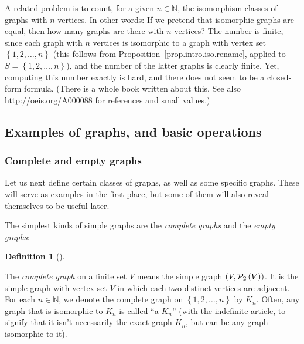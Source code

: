 \documentclass[numbers=enddot,12pt,final,onecolumn,notitlepage]{scrartcl}%
\theoremstyle{definition}
\newtheorem{defi}[theo]{Definition}
\newenvironment{definition}[1][]
{\begin{defi}[#1]\begin{leftbar}}
{\end{leftbar}\end{defi}}
\newcommand{\NN}{\mathbb{N}}
\newcommand{\powset}[2][]{\ifthenelse{\equal{#2}{}}{\mathcal{P}\left(#1\right)}{\mathcal{P}_{#1}\left(#2\right)}}
\newcommand{\set}[1]{\left\{ #1 \right\}}
\newcommand{\tup}[1]{\left( #1 \right)}
\begin{document}
A related problem is to count, for a given $n \in \NN$,
the isomorphism classes of graphs with $n$ vertices. In other words:
If we pretend that isomorphic graphs are equal, then how many graphs
are there with $n$ vertices? The number is finite, since each graph
with $n$ vertices is isomorphic to a graph with vertex set
$\set{1,2,\ldots, n}$ (this follows from
Proposition~\ref{prop.intro.iso.rename}, applied to
$S = \set{1,2,\ldots, n}$), and the number of the latter graphs is
clearly finite. Yet, computing this number exactly is hard, and there
does not seem to be a closed-form formula. (There is a whole book
\cite{HarPal73} written about this. See also
\url{http://oeis.org/A000088} for references and small values.)

\subsection{\label{sect.intro.paths}Examples of graphs, and basic
operations}

\subsubsection{Complete and empty graphs}

Let us next define certain classes of graphs, as well as some specific
graphs. These will serve as examples in the first place, but some of
them will also reveal themselves to be useful later.

The simplest kinds of simple graphs are the \textit{complete graphs}
and the \textit{empty graphs}:

\begin{definition} \label{def.intro.complete-graph}
The \textit{complete graph} on a finite set $V$ means
the simple graph $\tup{V, \powset[2]{V}}$. It is the
simple graph with vertex set $V$ in which each two distinct vertices
are adjacent.
For each $n \in \NN$, we denote the complete graph on
$\set{1,2,\ldots,n}$ by $K_n$. Often, any graph that is isomorphic to
$K_n$ is called ``a $K_n$'' (with the indefinite article, to signify
that it isn't necessarily the exact graph $K_n$, but can be any graph
isomorphic to it).
\end{definition}
\end{document}
